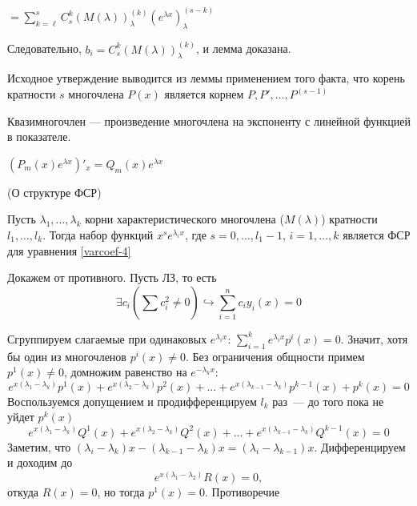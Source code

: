 $= \sum\limits_{k=\ell}^sC_s^k(M(\lambda))_{\lambda}^{(k)}(e^{\lambda x})_{\lambda}^{(s-k)}$

Следовательно, $b_i = C_s^k(M(\lambda))_{\lambda}^{(k)}$, и лемма доказана.

Исходное утверждение выводится из леммы применением того факта, что корень кратности $s$ многочлена $P(x)$ является корнем $P, P', \ldots, P^{(s-1)}$
\EndProof


\Def Квазимногочлен — произведение многочлена на экспоненту с линейной
функцией в показателе.

\Statement $(P_m(x)e^{\lambda x})'_x = Q_m(x)e^{\lambda x}$

\Th (О структуре ФСР)

Пусть $\lambda_1, \ldots, \lambda_k$ корни характеристического многочлена ($M(\lambda)$) кратности $l_1, \ldots, l_k$. Тогда набор функций $x^s e^{\lambda_i x}$, где $s = 0, \ldots, l_1-1$, $i = 1, \ldots, k$ является ФСР для уравнения \ref{varcoef-4}

\Proof
Докажем от противного. Пусть ЛЗ, то есть 
\[ \exists {c_i} (\sum_{}^{} c_i^2 \neq 0)\hookrightarrow \sum_{i=1}^{n} c_i y_i(x) = 0\]

Сгруппируем слагаемые при одинаковых $e^{\lambda_i x}$: $\sum_{i=1}^{k} e^{\lambda_i x} p^i(x) = 0$. Значит, хотя бы один из многочленов $p^i(x) \neq 0$. Без ограничения общности примем $p^1(x) \neq 0$, домножим равенство на $e^{-\lambda_k x}$:
\[e^{x(\lambda_1 - \lambda_k)} p^1(x) +
e^{x(\lambda_2 - \lambda_k)} p^2(x) + ... + 
e^{x(\lambda_{k-1} - \lambda_k)} p^{k-1}(x) + p^k(x) = 0\]
Воспользуемся допущением и продифференцируем $l_k$ раз~--- до того пока не уйдет $p^k(x)$
\[e^{x(\lambda_1 - \lambda_k)} Q^1(x) +
e^{x(\lambda_2 - \lambda_k)} Q^2(x) + ... + 
e^{x(\lambda_{k-1} - \lambda_k)} Q^{k-1}(x) = 0\]
Заметим, что $(\lambda_i - \lambda_k)x - (\lambda_{k-1} - \lambda_k)x = (\lambda_i - \lambda_{k-1})x$. Дифференцируем и доходим до 
\[e^{x(\lambda_1 - \lambda_2)} R(x) = 0,\] откуда $R(x) = 0$, но тогда $p^1(x) = 0$. Противоречие
\EndProof
